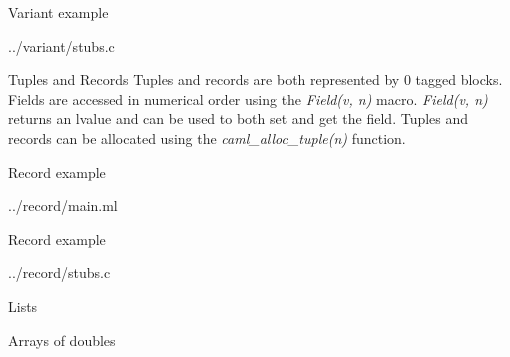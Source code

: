 \documentclass{beamer}
\begin{document}
\begin{frame}[fragile,shrink=20]{Variant example}
\begin{lstinputlisting}[language=ML]{../variant/stubs.c}
\end{lstinputlisting}
\end{frame}

\begin{frame}{Tuples and Records}
Tuples and records are both represented by 0 tagged blocks.  Fields are accessed in numerical order using the
\emph{Field(v, n)} macro.  \emph{Field(v, n)} returns an lvalue and can be used to both set and get the field.
Tuples and records can be allocated using the \emph{caml\_alloc\_tuple(n)} function.
\end{frame}

\begin{frame}[fragile]{Record example}
\begin{lstinputlisting}[language=ML]{../record/main.ml}
\end{lstinputlisting}
\end{frame}

\begin{frame}[fragile]{Record example}
\begin{lstinputlisting}[language=C]{../record/stubs.c}
\end{lstinputlisting}
\end{frame}

\begin{frame}{Lists}
\end{frame}

\begin{frame}{Arrays of doubles}
\end{frame}
\end{document}
